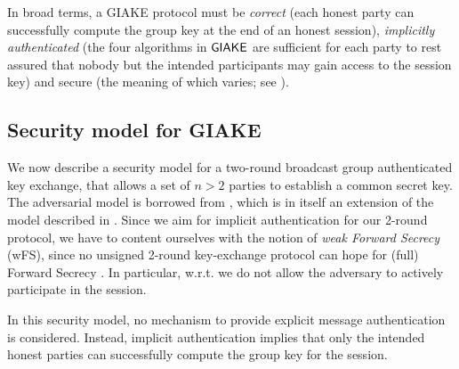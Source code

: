 	In broad terms, a GIAKE protocol must be \textit{correct} (each honest party can successfully compute the group key at the end of an honest session), \textit{implicitly authenticated} (the four algorithms in ${\mathsf{GIAKE}}$ are sufficient for each party to rest assured that nobody but the intended participants may gain access to the session key) and secure (the meaning of which varies; see ).

\subsection{Security model for GIAKE}\label{subsec:secmodel}
We now describe a security model for a two-round broadcast group authenticated key exchange, that allows a set of $n > 2$ parties to establish a common secret key.
The adversarial model is borrowed from \cite[Section 6.1]{PQR22}, which is in itself an extension of the model described in \cite{JKRS20}.
Since we aim for implicit authentication for our 2-round protocol, we have to content ourselves with the notion of \textit{weak Forward Secrecy} (wFS), since no unsigned 2-round key-exchange protocol can hope for (full) Forward Secrecy \cite[Section 3.2]{HMQV}.
In particular, w.r.t. \cite[Section 6.1]{PQR22} we do not allow the adversary to actively participate in the session.

In this security model, no mechanism to provide explicit message authentication is considered.
Instead, implicit authentication implies that only the intended honest parties can successfully compute the group key for the session.

